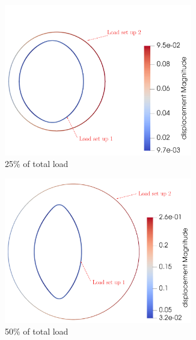 \documentclass[11pt,a4paper,final]{article}
\begin{document}
\begin{figure}[h]
\centering
\begin{subfigure}{0.24\textwidth}
\centering
\includegraphics[width=0.9\textwidth]{torus_ls_25_mech_mag.pdf}
\caption{25\% of total load}
\label{fig:3.13.1}
\end{subfigure}
\begin{subfigure}{0.24\textwidth}
\centering
\includegraphics[width=0.9\textwidth]{torus_ls_50_mech_mag.pdf}
\caption{50\% of total load}
\label{fig:3.13.2}
\end{subfigure}
\begin{subfigure}{0.24\textwidth}
\centering

\end{subfigure}
\end{figure}
\end{document}

